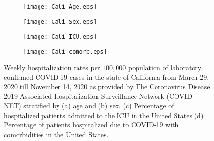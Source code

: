 \documentclass{article}
\begin{document}
\begin{figure}[h]
\begin{subfigure}{0.48\textwidth}
\centering
   \texttt{[image: Cali\_Age.eps]}
   \caption{}
   \label{fig:Cali_age}
\end{subfigure}
\begin{subfigure}{0.48\textwidth}
\centering
   \texttt{[image: Cali\_Sex.eps]}
   \caption{}
   \label{fig:Cali_sex}
\end{subfigure}
\begin{subfigure}{.48\textwidth}
  \centering
  \texttt{[image: Cali\_ICU.eps]}  
  \caption{}
  \label{fig:Cali_ICU}
\end{subfigure}
\begin{subfigure}{.48\textwidth}
  \centering
  \texttt{[image: Cali\_comorb.eps]}  
  \caption{}
  \label{fig:Cali_comorb}
\end{subfigure}
\caption{Weekly hospitalization rates per $100,000$ population of laboratory confirmed COVID-19 cases in the state of California from March 29, 2020 till November 14, 2020 as provided by The Coronavirus Disease 2019 Associated Hospitalization Surveillance Network (COVID-NET) stratified by (a) age and (b) sex. (c) Percentage of hospitalized patients admitted to the ICU in the United States (d) Percentage of patients hospitalized due to COVID-19 with comorbidities in the United States.}
\label{fig:Cali_demographics}
\end{figure}
\end{document}
